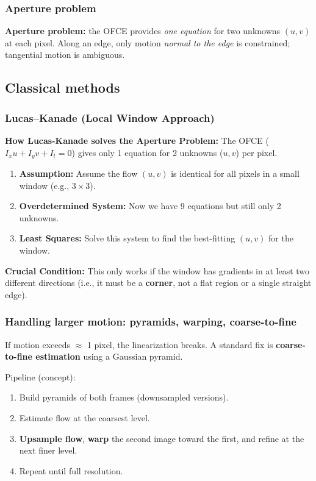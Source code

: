\documentclass[11pt,a4paper]{article}
\begin{document}
\subsubsection{Aperture problem}
\begin{defbox}
\textbf{Aperture problem:} the OFCE provides \emph{one equation} for two unknowns $(u,v)$ at each pixel.
Along an edge, only motion \emph{normal to the edge} is constrained; tangential motion is ambiguous.
\end{defbox}

\subsection{Classical methods}
\subsubsection{Lucas--Kanade (Local Window Approach)}

\begin{mathrule}
\textbf{How Lucas-Kanade solves the Aperture Problem:}
The OFCE ($I_x u + I_y v + I_t = 0$) gives only 1 equation for 2 unknowns ($u,v$) per pixel. 
\begin{enumerate}
  \item \textbf{Assumption:} Assume the flow $(u,v)$ is identical for all pixels in a small window (e.g., $3 \times 3$).
  \item \textbf{Overdetermined System:} Now we have 9 equations but still only 2 unknowns.
  \item \textbf{Least Squares:} Solve this system to find the best-fitting $(u,v)$ for the window.
\end{enumerate}
\textbf{Crucial Condition:} This only works if the window has gradients in at least two different directions (i.e., it must be a \textbf{corner}, not a flat region or a single straight edge).
\end{mathrule}

\subsubsection{Handling larger motion: pyramids, warping, coarse-to-fine}
\begin{defbox}
If motion exceeds \(\approx\) 1 pixel, the linearization breaks.
A standard fix is \textbf{coarse-to-fine estimation} using a Gaussian pyramid.
\end{defbox}

Pipeline (concept):
\begin{enumerate}
  \item Build pyramids of both frames (downsampled versions).
  \item Estimate flow at the coarsest level.
  \item \textbf{Upsample flow}, \textbf{warp} the second image toward the first, and refine at the next finer level.
  \item Repeat until full resolution.
\end{enumerate}
\end{document}
